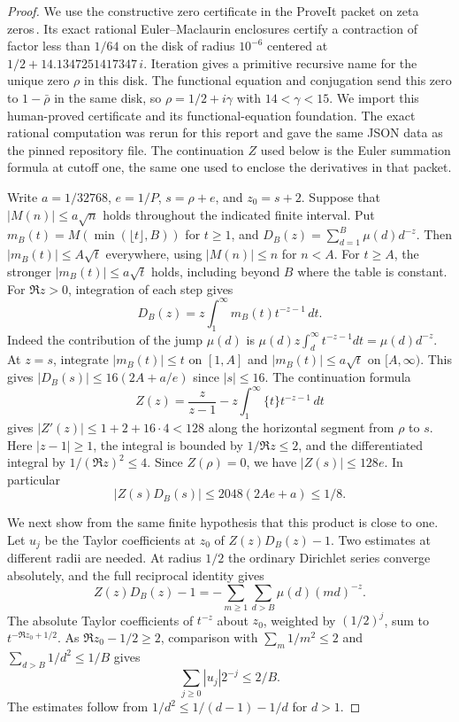 \begin{proof}
We use the constructive zero certificate in the ProveIt packet on zeta
zeros\,\cite{zeropacket}. Its exact rational Euler--Maclaurin enclosures
certify a contraction of factor less than $1/64$ on the disk of radius
$10^{-6}$ centered at $1/2+14.1347251417347\,i$. Iteration gives a
primitive recursive name for the unique zero $\rho$ in this disk. The
functional equation and conjugation send this zero to $1-\bar\rho$ in
the same disk, so $\rho=1/2+i\gamma$ with $14<\gamma<15$. We import
this human-proved certificate and its functional-equation foundation.
The exact rational computation was rerun for this report and gave the same JSON data as the pinned repository file. The continuation $Z$ used below is the Euler summation formula at cutoff
one, the same one used to enclose the derivatives in that packet.

Write $a=1/32768$, $e=1/P$, $s=\rho+e$, and $z_0=s+2$.
Suppose that $|M(n)|\le a\sqrt n$ holds throughout the indicated finite
interval. Put $m_B(t)=M(\min(\lfloor t\rfloor,B))$ for $t\ge1$, and
$D_B(z)=\sum_{d=1}^{B}\mu(d)d^{-z}$. Then $|m_B(t)|\le A\sqrt t$
everywhere, using $|M(n)|\le n$ for $n<A$. For $t\ge A$, the stronger
$|m_B(t)|\le a\sqrt t$ holds, including beyond $B$ where the table is
constant. For $\Re z>0$, integration of each step gives
\[
        D_B(z)=z\int_1^\infty m_B(t)t^{-z-1}\,dt .
\]
Indeed the contribution of the jump $\mu(d)$ is
$\mu(d)z\int_d^\infty t^{-z-1}dt=\mu(d)d^{-z}$.
At $z=s$, integrate $|m_B(t)|\le t$ on $[1,A]$ and
$|m_B(t)|\le a\sqrt t$ on $[A,\infty)$. This gives
$|D_B(s)|\le16(2A+a/e)$ since $|s|\le16$.
The continuation formula
\[
 Z(z)=\frac{z}{z-1}-z\int_1^\infty\{t\}t^{-z-1}\,dt
\]
gives $|Z'(z)|\le1+2+16\cdot4<128$ along the horizontal segment from
$\rho$ to $s$. Here $|z-1|\ge1$, the integral is bounded by
$1/\Re z\le2$, and the differentiated integral by $1/(\Re z)^2\le4$.
Since $Z(\rho)=0$, we have $|Z(s)|\le128 e$. In particular
\begin{equation}\label{eq:small-omega-product}
        |Z(s)D_B(s)|\le 2048(2Ae+a)\le 1/8.
\end{equation}

We next show from the same finite hypothesis that this product is close
to one. Let $u_j$ be the Taylor coefficients at $z_0$ of
$Z(z)D_B(z)-1$. Two estimates at different radii are needed. At radius
$1/2$ the ordinary Dirichlet series converge absolutely, and the full
reciprocal identity gives
\[
 Z(z)D_B(z)-1=-\sum_{m\ge1}\sum_{d>B}\mu(d)(md)^{-z}.
\]
The absolute Taylor coefficients of $t^{-z}$ about $z_0$, weighted by
$(1/2)^j$, sum to $t^{-\Re z_0+1/2}$. As $\Re z_0-1/2\ge2$, comparison
with $\sum_m 1/m^2\le2$ and $\sum_{d>B}1/d^2\le1/B$ gives
\begin{equation}\label{eq:omega-small-radius}
                       \sum_{j\ge0}|u_j|2^{-j}\le 2/B.
\end{equation}
The estimates follow from $1/d^2\le1/(d-1)-1/d$ for $d>1$.


\end{proof}

